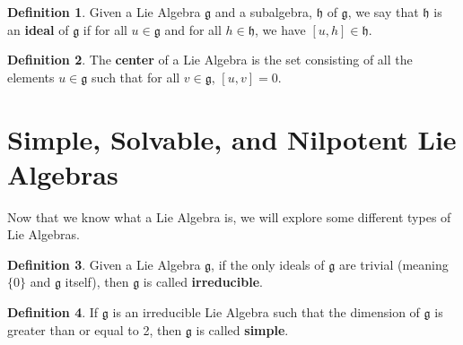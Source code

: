 \documentclass[12pt]{article}
\theoremstyle{definition}
\newtheorem{definition}{Definition}[section]
\theoremstyle{definition}
\begin{document}
        \begin{definition}
            Given a Lie Algebra $\mathfrak{g}$ and a subalgebra, $\mathfrak{h}$
            of $\mathfrak{g}$, we say that $\mathfrak{h}$ is an \textbf{ideal}
            of $\mathfrak{g}$ if for all $u\in\mathfrak{g}$ and for all
            $h\in\mathfrak{h}$, we have $[u, h]\in\mathfrak{h}$.
        \end{definition}
        \begin{definition}
            The \textbf{center} of a Lie Algebra is the set consisting of all
            the elements $u\in \mathfrak{g}$ such that for all $v\in
            \mathfrak{g}$, $[u, v]=0$.
        \end{definition}
    \section{Simple, Solvable, and Nilpotent Lie Algebras}
        Now that we know what a Lie Algebra is, we will explore some different
        types of Lie Algebras.
        \begin{definition}
            Given a Lie Algebra $\mathfrak{g}$, if the only ideals of
            $\mathfrak{g}$ are trivial (meaning $\{0\}$ and $\mathfrak{g}$
            itself), then $\mathfrak{g}$ is called \textbf{irreducible}.
        \end{definition}
        \begin{definition}
            If $\mathfrak{g}$ is an irreducible Lie Algebra such that the
            dimension of $\mathfrak{g}$ is greater than or equal to 2, then
            $\mathfrak{g}$  is called \textbf{simple}.
        \end{definition}
\end{document}
